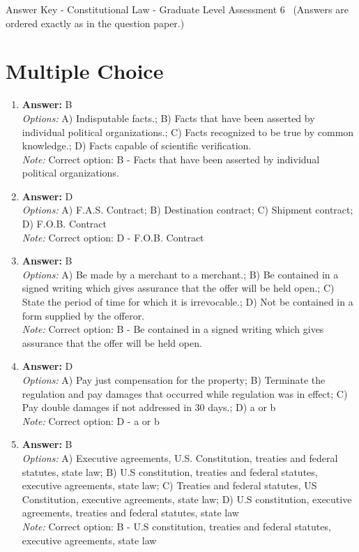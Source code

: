 \documentclass[12pt]{article}
\begin{document}
\begin{center}
Answer Key - Constitutional Law - Graduate Level Assessment 6 \
\small (Answers are ordered exactly as in the question paper.)
\end{center}

\section*{Multiple Choice}
\begin{enumerate}[label=\arabic*.]
\item \textbf{Answer:} B
\\ \textit{Options:} A) Indisputable facts.; B) Facts that have been asserted by individual political organizations.; C) Facts recognized to be true by common knowledge.; D) Facts capable of scientific verification.
\\ \textit{Note:} Correct option: B - Facts that have been asserted by individual political organizations.
\item \textbf{Answer:} D
\\ \textit{Options:} A) F.A.S. Contract; B) Destination contract; C) Shipment contract; D) F.O.B. Contract
\\ \textit{Note:} Correct option: D - F.O.B. Contract
\item \textbf{Answer:} B
\\ \textit{Options:} A) Be made by a merchant to a merchant.; B) Be contained in a signed writing which gives assurance that the offer will be held open.; C) State the period of time for which it is irrevocable.; D) Not be contained in a form supplied by the offeror.
\\ \textit{Note:} Correct option: B - Be contained in a signed writing which gives assurance that the offer will be held open.
\item \textbf{Answer:} D
\\ \textit{Options:} A) Pay just compensation for the property; B) Terminate the regulation and pay damages that occurred while regulation was in effect; C) Pay double damages if not addressed in 30 days.; D) a or b
\\ \textit{Note:} Correct option: D - a or b
\item \textbf{Answer:} B
\\ \textit{Options:} A) Executive agreements, U.S. Constitution, treaties and federal statutes, state law; B) U.S constitution, treaties and federal statutes, executive agreements, state law; C) Treaties and federal statutes, US Constitution, executive agreements, state law; D) U.S constitution, executive agreements, treaties and federal statutes, state law
\\ \textit{Note:} Correct option: B - U.S constitution, treaties and federal statutes, executive agreements, state law
\end{enumerate}
\end{document}
